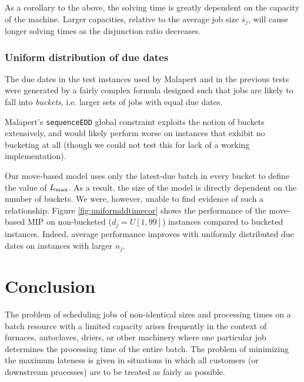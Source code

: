 \documentclass[13pt, letterpaper, oneside]{book}
\begin{document}
As a corollary to the above, the solving time is greatly dependent on the
capacity of the machine. Larger capacities, relative to the average job size
$\bar{s}_j$, will cause longer solving times as the disjunction ratio decreases.

\subsection{Uniform distribution of due dates}
The due dates in the test instances used by Malapert and in the previous tests
were generated by a fairly complex formula designed such that jobs are likely to
fall into \textit{buckets}, i.e. larger sets of jobs with equal due dates.

Malapert's \texttt{sequenceEDD} global constraint exploits the notion of buckets
extensively, and would likely perform worse on instances that exhibit no
bucketing at all (though we could not test this for lack of a working
implementation).

Our move-based model uses only the latest-due batch in every bucket to define
the value of $L_{\text{max}}$. As a result, the size of the model is directly dependent
on the number of buckets. We were, however, unable to find evidence of such a
relationship: Figure \ref{fig:uniformddtimecor} shows the performance of the
move-based MIP on non-bucketed ($d_j = U[1, 99]$) instances compared to bucketed
instances.  Indeed, average performance improves with uniformly distributed due dates on
instances with larger $n_j$.



\chapter{Conclusion}\label{sec:futurework}
The problem of scheduling jobs of non-identical sizes and processing times on a
batch resource with a limited capacity arises frequently in the context of
furnaces, autoclaves, driers, or other machinery where one particular job
determines the processing time of the entire batch. The problem of minimizing
the maximum lateness is given in situations in which all customers (or
downstream processes) are to be treated as fairly as possible.
\end{document}

